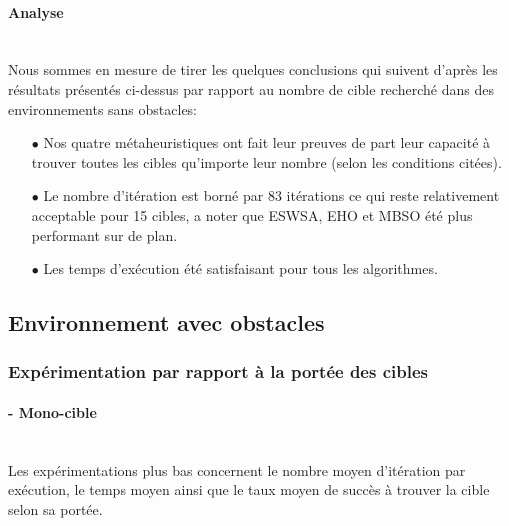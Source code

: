 \paragraph{Analyse}
\textbf{ }\\
Nous sommes en mesure de tirer les quelques conclusions qui suivent d'après les résultats présentés ci-dessus par rapport au nombre de cible recherché dans des environnements sans obstacles:
\begin{itemize}
	\item[$\bullet$] Nos quatre métaheuristiques ont fait leur preuves de part leur capacité à trouver toutes les cibles qu'importe leur nombre (selon les conditions citées).
	\item[$\bullet$] Le nombre d'itération est borné par 83 itérations ce qui reste relativement acceptable pour 15 cibles, a noter que ESWSA, EHO et MBSO été plus performant sur de plan.
	\item[$\bullet$] Les temps d'exécution été satisfaisant pour tous les algorithmes. 
\end{itemize}






\subsection{Environnement avec obstacles}
\subsubsection{Expérimentation par rapport à la portée des cibles}

\paragraph{- Mono-cible}
\textbf{ }\\
Les expérimentations plus bas concernent le nombre moyen d'itération par exécution, le temps moyen ainsi que le taux moyen de succès à trouver la cible selon sa portée.

